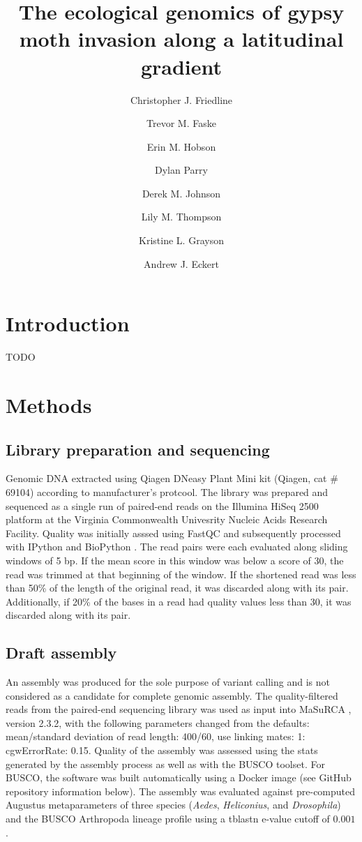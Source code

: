 \documentclass[fleqn,10pt]{wlpeerj}
\title{The ecological genomics of gypsy moth invasion along a latitudinal gradient}
\author[1]{Christopher J. Friedline}
\author[1]{Trevor M. Faske}
\author[1]{Erin M. Hobson}
\author[2]{Dylan Parry}
\author[1]{Derek M. Johnson}
\author[3]{Lily M. Thompson}
\author[3,*]{Kristine L. Grayson}
\author[1,*,\textdagger]{Andrew J. Eckert}
\affil[1]{Department of Biology, Virginia Commonwealth University}
\affil[2]{College of Environmental Science and Forestry, State University of New York}
\affil[3]{Department of Biology, University of Richmond}
\affil[*]{Author contributed equally}
\affil[ \textdagger]{Corresponding author}
\begin{document}
\flushbottom
\maketitle
\thispagestyle{empty}

\section*{Introduction}
TODO


\section*{Methods}

\subsection*{Library preparation and sequencing}

Genomic DNA extracted using Qiagen DNeasy Plant Mini kit (Qiagen, cat \# 69104)
according to manufacturer's protcool.  The library was prepared and sequenced as
a single run of paired-end reads on the Illumina HiSeq 2500 platform at the
Virginia Commonwealth Univesrity Nucleic Acids Research Facility. Quality was
initially asssed using FastQC \citep{fastqc} and subsequently processed with
IPython \cite{Perez:2007hy} and BioPython \cite{Cock:2009hj}. The read pairs
were each evaluated along sliding windows of 5 bp.  If the mean score in this
window was below a score of 30, the read was trimmed at that beginning of the
window. If the shortened read was less than 50\% of the length of the original
read, it was discarded along with its pair. Additionally, if 20\% of the bases
in a read had quality values less than 30, it was discarded along with its pair.

\subsection*{Draft assembly}

An assembly was produced for the sole purpose of variant calling and is not
considered as a candidate for complete genomic assembly. The quality-filtered
reads from the paired-end sequencing library was used as input into MaSuRCA
\citep{Zimin:2013kn}, version 2.3.2, with the following parameters changed from
the defaults: mean/standard deviation of read length: 400/60, use linking mates:
1: cgwErrorRate: 0.15.  Quality of the assembly was assessed using  the stats
generated by the assembly process as well as with the BUSCO \citep{Simao:2015kk}
toolset. For BUSCO, the software was built automatically using a Docker image
(see GitHub repository information below). The assembly was evaluated against
pre-computed Augustus \citep{Stanke:2003eo} metaparameters of  three species
(\textit{Aedes}, \textit{Heliconius}, and \textit{Drosophila}) and the BUSCO
Arthropoda lineage profile using a tblastn e-value cutoff of $0.001$.
\end{document}
